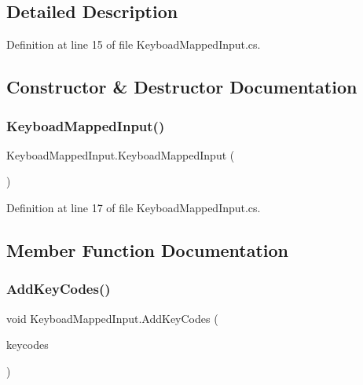 \subsection{Detailed Description}


Definition at line 15 of file Keyboad\+Mapped\+Input.\+cs.



\subsection{Constructor \& Destructor Documentation}
\mbox{\label{class_keyboad_mapped_input_a6b4e13ca02f5099092e84720260bc8fc}} 
\subsubsection{\texorpdfstring{Keyboad\+Mapped\+Input()}{KeyboadMappedInput()}}
{\footnotesize\ttfamily Keyboad\+Mapped\+Input.\+Keyboad\+Mapped\+Input (\begin{DoxyParamCaption}{ }\end{DoxyParamCaption})}



Definition at line 17 of file Keyboad\+Mapped\+Input.\+cs.



\subsection{Member Function Documentation}
\mbox{\label{class_keyboad_mapped_input_a603eb7465f60b5516d72338dc37ed11a}} 
\subsubsection{\texorpdfstring{Add\+Key\+Codes()}{AddKeyCodes()}}
{\footnotesize\ttfamily void Keyboad\+Mapped\+Input.\+Add\+Key\+Codes (\begin{DoxyParamCaption}\item[{Key\+Code \mbox{[}$\,$\mbox{]}}]{keycodes }\end{DoxyParamCaption})}



